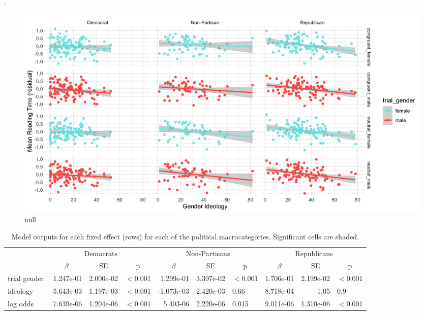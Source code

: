\documentclass[10pt,letterpaper]{article}
\begin{document}
\newpage
. 
\newpage

\begin{figure}[h]
	\centering
	\includegraphics[scale=0.18]{sprt-neutral-3x3.png}
	\caption{null}
\end{figure}

 
 \begin{table}
 	\centering
 	\caption{Model outputs for each fixed effect (rows) for each of the political macrocategories. Significant cells are shaded.}
 	\vskip 0.12in
 	\begin{tabular}{l r r l r r l r r l }
 				\toprule
 				& \multicolumn{3}{c}{Democrats} & \multicolumn{3}{c}{Non-Partisans} & \multicolumn{3}{c}{Republicans} \\ \cmidrule(r){2-4} \cmidrule(r){5-7} \cmidrule(r){8-10}
 				& \multicolumn{1}{c}{$\beta$} & \multicolumn{1}{c}{SE} & \multicolumn{1}{c}{p} & \multicolumn{1}{c}{$\beta$} & \multicolumn{1}{c}{SE} & \multicolumn{1}{c}{p} & \multicolumn{1}{c}{$\beta$} & \multicolumn{1}{c}{SE} & \multicolumn{1}{c}{p}\\ 
 				\midrule
 				trial gender   & 1.247e-01 & 2.000e-02 & \cellcolor{lightgray} $<$0.001        & 1.299e-01 & 3.397e-02 & \cellcolor{lightgray} $<$0.001 & 1.706e-01  & 2.199e-02 &  \cellcolor{lightgray} $<$0.001\\
 				ideology & -5.643e-03  & 1.197e-03 & \cellcolor{lightgray} $<$0.001            & -1.073e-03 & 2.420e-03 & 0.66           & 8.718e-04  & 1.05 & 0.9 \\
 				log odds & 7.639e-06 & 1.204e-06  &  \cellcolor{lightgray} $<$0.001            & 5.403-06 & 2.220e-06 & \cellcolor{gray} 0.015     & 9.011e-06  & 1.310e-06 & \cellcolor{lightgray} $<$0.001\\
 				\bottomrule
 			\end{tabular}
 			\label{tab:exp2results}
 		\end{table}
 
 \newpage
\end{document}
